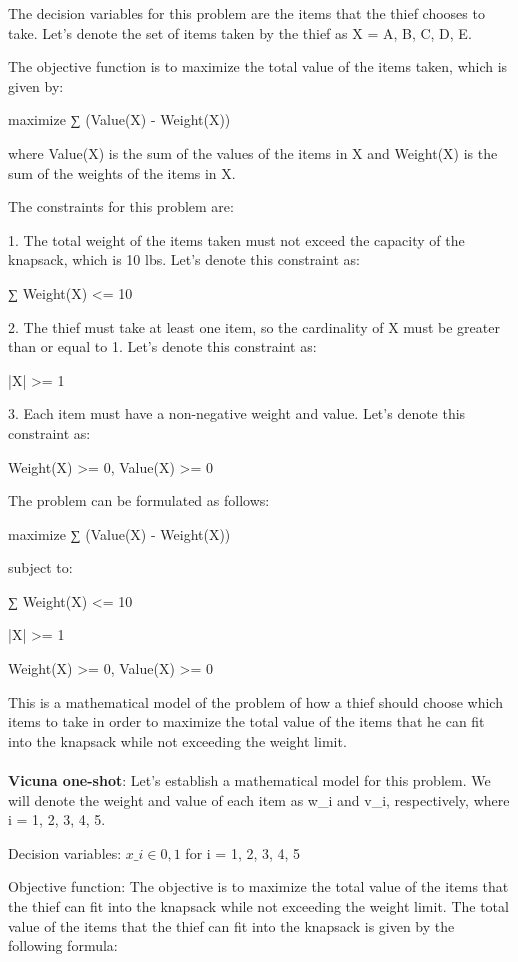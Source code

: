 \documentclass{article}%
\begin{document}
The decision variables for this problem are the items that the thief chooses to take. Let's denote the set of items taken by the thief as X = {A, B, C, D, E}.

The objective function is to maximize the total value of the items taken, which is given by:

maximize ∑ (Value(X) - Weight(X))

where Value(X) is the sum of the values of the items in X and Weight(X) is the sum of the weights of the items in X.

The constraints for this problem are:

1. The total weight of the items taken must not exceed the capacity of the knapsack, which is 10 lbs. Let's denote this constraint as:

∑ Weight(X) <= 10

2. The thief must take at least one item, so the cardinality of X must be greater than or equal to 1. Let's denote this constraint as:

|X| >= 1

3. Each item must have a non-negative weight and value. Let's denote this constraint as:

Weight(X) >= 0, Value(X) >= 0

The problem can be formulated as follows:

maximize ∑ (Value(X) - Weight(X))

subject to:

∑ Weight(X) <= 10

|X| >= 1

Weight(X) >= 0, Value(X) >= 0

This is a mathematical model of the problem of how a thief should choose which items to take in order to maximize the total value of the items that he can fit into the knapsack while not exceeding the weight limit.\\\\%
\textbf{Vicuna one-shot}: Let's establish a mathematical model for this problem. We will denote the weight and value of each item as w\_i and v\_i, respectively, where i = 1, 2, 3, 4, 5.

Decision variables:
$x\_i \in {0, 1}$ for i = 1, 2, 3, 4, 5

Objective function:
The objective is to maximize the total value of the items that the thief can fit into the knapsack while not exceeding the weight limit. The total value of the items that the thief can fit into the knapsack is given by the following formula:
\end{document}
